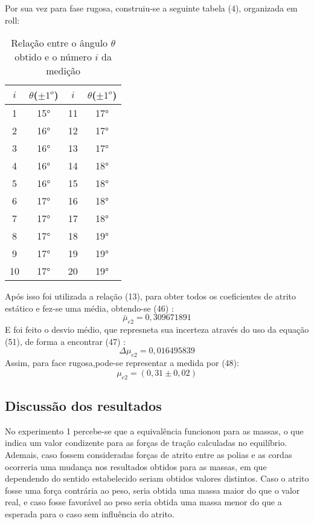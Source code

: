 \documentclass[12pt, letterpaper]{article}
\begin{document}
Por sua vez para fase rugosa, construiu-se a seguinte tabela (4), organizada em roll:
\begin{table}[!h]
 \centering
        \caption{Relação entre o ângulo $\theta$ obtido e o número $i$ da medição}
         \begin{tabular}{| c | c | c | c |}
           \hline
             $i$  & $\theta$($\pm 1^{o}$) & $i$  & $\theta $($\pm 1^{o}$)\\
            \hline
               1   &  15° &  11 & 17°   \\
           \hline    
            2   &   16°     & 12 &  17° \\
           \hline    
            3   &   16°  &   13 & 17°\\
           \hline    
               4   &   16° &   14 & 18° \\
           \hline    
               5  &   16°  &  15 & 18°\\
           \hline    
               6   &   17°  & 16 & 18°\\
           \hline    
               7    &  17°   &17 & 18°\\
           \hline
               8    &  17° & 18 & 19°\\
           \hline
               9  & 17° & 19 & 19° \\
            \hline 
             10 & 17°  &  20& 19°\\
             
             \hline 
        \end{tabular} 
        \label{tab:2}

\end{table}
\newpage
Após isso foi utilizada a relação (13), para obter todos os coeficientes de atrito estático e fez-se uma média, obtendo-se (46) :
\begin{equation}
\bar\mu_{e2} = 0,309671891
\end{equation}
E foi feito o desvio médio, que represneta sua incerteza através do uso da equação (51), de forma a encontrar (47) :
\begin{equation}
\Delta\mu_{e2} = 0,016495839
\end{equation}
Assim, para face rugosa,pode-se representar a medida por (48):
\begin{equation}
    \mu_{e2} =  (0,31 \pm 0,02) 
\end{equation}


\subsection{Discussão dos resultados}
No experimento 1 percebe-se que a equivalência funcionou para as massas, o que indica um valor condizente para as forças de tração calculadas no equilíbrio. Ademais, caso fossem consideradas forças de atrito entre as polias e as cordas ocorreria uma mudança nos resultados obtidos para as massas, em que dependendo do sentido estabelecido seriam obtidos valores distintos. Caso o atrito fosse uma força contrária ao peso, seria obtida uma massa maior do que o valor real, e caso fosse favorável ao peso seria obtida uma massa menor do que a esperada para o caso sem influência do atrito.
\end{document}
